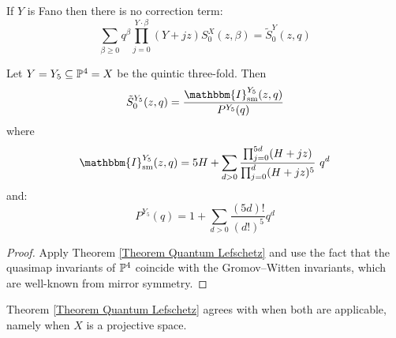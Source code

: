 \begin{cor}
 If $Y$ is Fano then there is no correction term:
\begin{equation*} \sum_{\beta\geq 0} q^\beta\prod_{j=0}^{Y\cdot\beta}(Y+jz)S_0^X(z,\beta) = \tilde{S}_0^Y(z,q) \end{equation*}
\end{cor}

\begin{cor}
Let $Y = Y_5 \subseteq \mathbb P^4 = X$ be the quintic three-fold. Then
\begin{equation*} \tilde{S}_0^{Y_5}(z,q)=\frac{\mathbbm{I}_{\text{sm}}^{Y_5}(z,q)}{P^{Y_5}(q)} \end{equation*}
where
\begin{equation*} \mathbbm{I}_{\text{sm}}^{Y_5}(z,q)=5H+\sum_{d>0}\frac{\prod_{j=0}^{5d}(H+jz)}{\prod_{j=0}^{d}(H+jz)^5} \ q^d \end{equation*}
and:
\begin{equation*} P^{Y_5}(q)=1+\sum_{d>0}\frac{(5d)!}{(d!)^5}q^d \end{equation*}
\end{cor}
\begin{proof} Apply Theorem \ref{Theorem Quantum Lefschetz} and use the fact that the quasimap invariants of $\mathbb P^4$ coincide with the Gromov--Witten invariants, which are well-known from mirror symmetry. \end{proof}

\begin{remark}
Theorem \ref{Theorem Quantum Lefschetz} agrees with \cite[Theorem~1]{CZ-mirror} when both are applicable, namely when $X$ is a projective space.
\end{remark}

